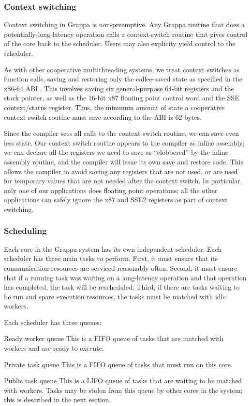\subsubsection{Context switching}

Context switching in Grappa is non-preemptive. Any Grappa routine that
does a potentially-long-latency operation calls a context-switch
routine that gives control of the core back to the scheduler. Users
may also explicity yield control to the scheduler.

As with other cooperative multithreading systems, we treat context
switches as function calls, saving and restoring only the callee-saved
state as specified in the x86-64 ABI . This involves saving
six general-purpose 64-bit registers and the stack pointer, as well as
the 16-bit x87 floating point control word and the SSE context/status
register. Thus, the minimum amount of state a cooperative context
switch routine must save according to the ABI is 62 bytes.

Since the compiler sees all calls to the context switch routine, we
can save even less state. Our context switch routine appears to the
compiler as inline assembly; we can declare all the registers we need
to save as ``clobbered'' by the inline assembly routine, and the
compiler will issue its own save and restore code. This allows the
compiler to avoid saving any registers that are not used, or are used
for temporary values that are not needed after the context switch. In
particular, only one of our applications does floating point
operations; all the other applications can safely ignore the x87 and
SSE2 registers as part of context switching.

\subsubsection{Scheduling}

Each core in the Grappa system has its own independent scheduler. Each
scheduler has three main tasks to perform.  First, it must ensure that
its communication resources are serviced reasonably often. Second, it
must ensure that if a running task was waiting on a long-latency
operation and that operation has completed, the task will be
rescheduled. Third, if there are tasks waiting to be run and spare
execution resources, the tasks must be matched with idle workers.

Each scheduler has three queues:
\begin{description}
\item{Ready worker queue} This is a FIFO queue of tasks that are
  matched with workers and are ready to execute.
\item{Private task queue} This is a FIFO queue of tasks that must run on this core.
\item{Public task queue} This is a LIFO queue of tasks that are
  waiting to be matched with workers. Tasks may be stolen from this
  queue by other cores in the system; this is described in the next section.
\end{description}

